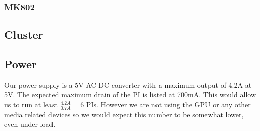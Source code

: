 \subsubsection{MK802}

\subsection{Cluster}
\subsection{Power}
Our power supply is a 5V AC-DC converter with a maximum output of 4.2A at 5V. The expected maximum drain of the PI is listed at 700mA\cite{raspi_power_drain}. This would allow us to run at least $\frac{4.2A}{0.7A}=6$ PIs.
However we are not using the GPU or any other media related devices so we would expect this number to be somewhat lower, even under load.
